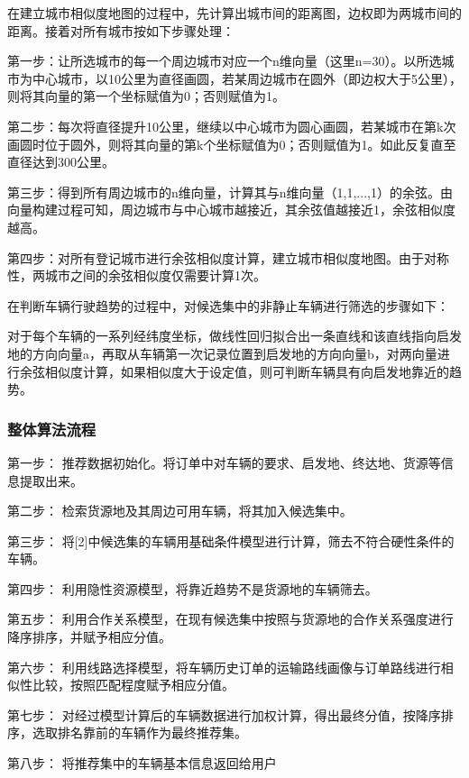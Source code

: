 \documentclass[UTF8]{ctexart}
\begin{document}
\begin{multicols}{2}
在建立城市相似度地图的过程中，先计算出城市间的距离图，边权即为两城市间的距离。接着对所有城市按如下步骤处理：

第一步：让所选城市的每一个周边城市对应一个n维向量（这里n=30）。以所选城市为中心城市，以10公里为直径画圆，若某周边城市在圆外（即边权大于5公里），则将其向量的第一个坐标赋值为0；否则赋值为1。

第二步：每次将直径提升10公里，继续以中心城市为圆心画圆，若某城市在第k次画圆时位于圆外，则将其向量的第k个坐标赋值为0；否则赋值为1。如此反复直至直径达到300公里。

第三步：得到所有周边城市的n维向量，计算其与n维向量（1,1,...,1）的余弦。由向量构建过程可知，周边城市与中心城市越接近，其余弦值越接近1，余弦相似度越高。

第四步：对所有登记城市进行余弦相似度计算，建立城市相似度地图。由于对称性，两城市之间的余弦相似度仅需要计算1次。

在判断车辆行驶趋势的过程中，对候选集中的非静止车辆进行筛选的步骤如下：

对于每个车辆的一系列经纬度坐标，做线性回归拟合出一条直线和该直线指向启发地的方向向量a，再取从车辆第一次记录位置到启发地的方向向量b，对两向量进行余弦相似度计算，如果相似度大于设定值，则可判断车辆具有向启发地靠近的趋势。

\subsubsection{整体算法流程}


第一步： 推荐数据初始化。将订单中对车辆的要求、启发地、终达地、货源等信息提取出来。

第二步： 检索货源地及其周边可用车辆，将其加入候选集中。

第三步： 将[2]中候选集的车辆用基础条件模型进行计算，筛去不符合硬性条件的车辆。

第四步： 利用隐性资源模型，将靠近趋势不是货源地的车辆筛去。

第五步： 利用合作关系模型，在现有候选集中按照与货源地的合作关系强度进行降序排序，并赋予相应分值。

第六步： 利用线路选择模型，将车辆历史订单的运输路线画像与订单路线进行相似性比较，按照匹配程度赋予相应分值。

第七步： 对经过模型计算后的车辆数据进行加权计算，得出最终分值，按降序排序，选取排名靠前的车辆作为最终推荐集。

第八步： 将推荐集中的车辆基本信息返回给用户

















\end{multicols}
\end{document}

